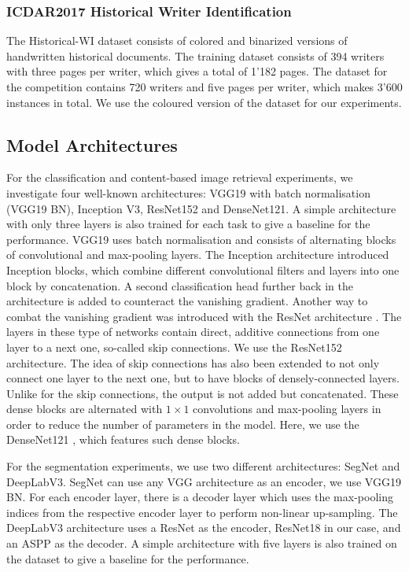 \documentclass[journal]{IEEEtran}
\newcommand{\af}[1]{{\color{black}#1}}
\begin{document}
\subsubsection{ICDAR2017 Historical Writer Identification}
The \ac{Historical-WI} dataset \cite{fiel2017icdar2017} consists of colored and binarized versions of handwritten historical documents. 
The training dataset consists of 394 writers with three pages per writer, which gives a total of 1'182 pages. 
The dataset for the competition contains 720 writers and five pages per writer, which makes 3'600 instances in total. 
We use the coloured version of the dataset for our experiments.


\subsection{Model Architectures}
\label{exp:architecture}


For the \af{classification and content-based image retrieval} experiments, we investigate four well-known architectures: VGG19 with batch normalisation (VGG19 BN), Inception V3, ResNet152 and DenseNet121.
A simple architecture with \af{only three} layers is also trained for each task to give a baseline for the performance.
VGG19 uses batch normalisation \cite{simonyan2014very} and consists of alternating blocks of convolutional and max-pooling layers. 
The Inception architecture \cite{Szegedy_2015_CVPR} introduced Inception blocks, which combine different convolutional filters and layers into one block by concatenation.
A second classification head further back in the architecture is added to counteract the vanishing gradient.
Another way to combat the vanishing gradient was introduced with the ResNet architecture \cite{DBLP:journals/corr/HeZRS15}. 
The layers in these type of networks contain direct, additive connections from one layer to a next one, so-called skip connections. 
We use the ResNet152 architecture. 
The idea of skip connections has also been extended to not only connect one layer to the next one, but to have blocks of densely-connected layers.
Unlike for the skip connections, the output is not added but concatenated.
These dense blocks are alternated with $1\times1$ convolutions and max-pooling layers in order to reduce the number of parameters in the model. 
Here, we use the DenseNet121 \cite{DBLP:journals/corr/HuangLW16a}, which features such dense blocks.

For the segmentation experiments, we use two different architectures: SegNet and DeepLabV3.
SegNet \cite{DBLP:journals/corr/BadrinarayananH15} can use any VGG architecture as an encoder, we use VGG19 BN. 
For each encoder layer, there is a decoder layer which uses the max-pooling indices from the respective encoder layer to perform non-linear up-sampling.
The DeepLabV3 architecture \cite{DBLP:journals/corr/ChenPSA17} uses a ResNet as the encoder, ResNet18 in our case, and an \ac{ASPP} as the decoder.
A simple architecture with five layers is also trained on the dataset to give a baseline for the performance.
 
\end{document}
